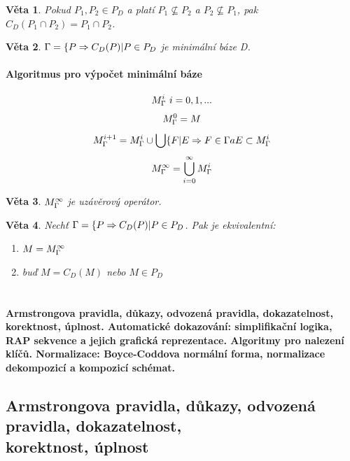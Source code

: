 \documentclass[10pt,a4paper]{article}
\newtheorem{veta}{Věta}
\begin{document}
\begin{veta}
Pokud $P_1,P_2 \in P_D$ a platí $P_1 \nsubseteq P_2$ a $P_2 \nsubseteq P_1$, pak $C_D(P_1 \cap P_2) = P_1 \cap P_2$.
\end{veta}

\begin{veta}
$\Gamma = \{P \Rightarrow C_D(P) | P \in P_D$ je minimální báze D.
\end{veta}

\paragraph{Algoritmus pro výpočet minimální báze}
$$M_\Gamma^i~ i = 0,1,...$$
$$M_\Gamma^0 = M$$
$$M_\Gamma^{i+1} = M_\Gamma^i \cup \bigcup\{F | E \Rightarrow F \in \Gamma a E \subset M_\Gamma^i$$
$$M_\Gamma^\infty = \bigcup_{i=0}^\infty M_\Gamma^i$$


\begin{veta}
$M_\Gamma^\infty$ je uzávěrový operátor.
\end{veta}

\begin{veta}
Nechť $\Gamma = \{P \Rightarrow C_D(P) | P \in P_D$. Pak je ekvivalentní:
\begin{enumerate}[i]
\item $M = M_\Gamma^\infty$
\item buď $M = C_D(M)$ nebo $M \in P_D$
\end{enumerate}
\end{veta}

\section{}
\paragraph{Armstrongova pravidla, důkazy, odvozená pravidla, dokazatelnost, korektnost, úplnost. Automatické dokazování: simplifikační logika, RAP sekvence a jejich grafická reprezentace.
Algoritmy pro nalezení klíčů. Normalizace: Boyce-Coddova normální forma, normalizace dekompozicí a kompozicí schémat.}

\subsection{Armstrongova pravidla, důkazy, odvozená pravidla, dokazatelnost,\\ korektnost, úplnost}
\end{document}
